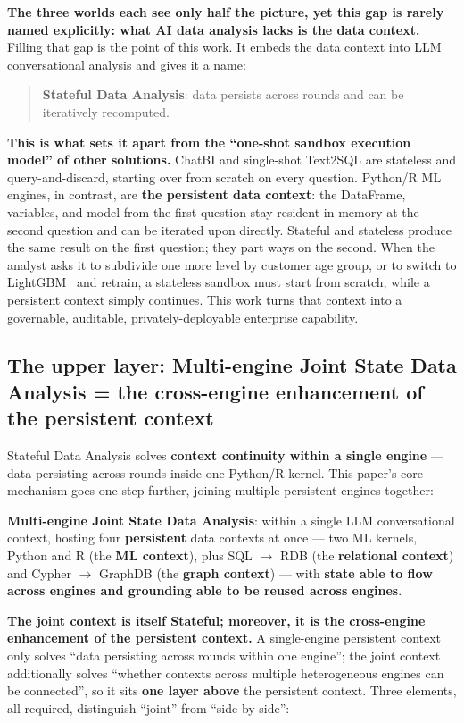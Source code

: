 \documentclass[11pt]{article}
\begin{document}
\textbf{The three worlds each see only half the picture, yet this gap is rarely named explicitly: what AI data analysis lacks is the data context.} Filling that gap is the point of this work. It embeds the data context into LLM conversational analysis and gives it a name:

\begin{quote}
\textbf{Stateful Data Analysis}: data persists across rounds and can be iteratively recomputed.
\end{quote}

\textbf{This is what sets it apart from the ``one-shot sandbox execution model'' of other solutions.} ChatBI and single-shot Text2SQL are stateless and query-and-discard, starting over from scratch on every question. Python/R ML engines, in contrast, are \textbf{the persistent data context}: the DataFrame, variables, and model from the first question stay resident in memory at the second question and can be iterated upon directly. Stateful and stateless produce the same result on the first question; they part ways on the second. When the analyst asks it to subdivide one more level by customer age group, or to switch to LightGBM~\cite{lightgbm} and retrain, a stateless sandbox must start from scratch, while a persistent context simply continues. This work turns that context into a governable, auditable, privately-deployable enterprise capability.

\subsection{The upper layer: Multi-engine Joint State Data Analysis = the cross-engine enhancement of the persistent context}

Stateful Data Analysis solves \textbf{context continuity within a single engine} --- data persisting across rounds inside one Python/R kernel. This paper's core mechanism goes one step further, joining multiple persistent engines together:

\textbf{Multi-engine Joint State Data Analysis}: within a single LLM conversational context, hosting four \textbf{persistent} data contexts at once --- two ML kernels, Python and R (the \textbf{ML context}), plus SQL $\rightarrow$ RDB (the \textbf{relational context}) and Cypher $\rightarrow$ GraphDB (the \textbf{graph context}) --- with \textbf{state able to flow across engines and grounding able to be reused across engines}.

\textbf{The joint context is itself Stateful; moreover, it is the cross-engine enhancement of the persistent context.} A single-engine persistent context only solves ``data persisting across rounds within one engine''; the joint context additionally solves ``whether contexts across multiple heterogeneous engines can be connected'', so it sits \textbf{one layer above} the persistent context. Three elements, all required, distinguish ``joint'' from ``side-by-side'':
\end{document}
